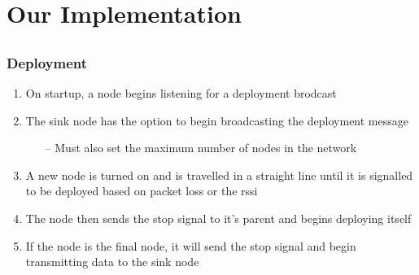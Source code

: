\section{Our Implementation}
\subsection*{}

\begin{frame}[t]
  \frametitle{Deployment}

  \begin{enumerate}
  \item On startup, a node begins listening for a deployment brodcast
  \item The sink node has the option to begin broadcasting the deployment message
    \begin{itemize}
    \item[--] Must also set the maximum number of nodes in the network
    \end{itemize}
  \item A new node is turned on and is travelled in a straight line until it is signalled to be deployed based on packet loss or the rssi
  \item The node then sends the stop signal to it's parent and begins deploying itself
  \item If the node is the final node, it will send the stop signal and begin transmitting data to the sink node
    
  \end{enumerate}
  
\end{frame}

